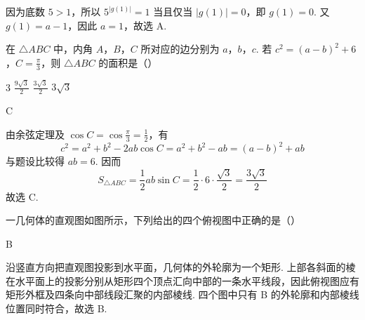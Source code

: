 \begin{solution}
因为底数 \(5>1\)，所以 \(5^{|g(1)|}=1\) 当且仅当 \(|g(1)|=0\)，即 \(g(1)=0\). 又 \(g(1)=a-1\)，因此 \(a=1\)，故选 A.
\end{solution}

\begin{problem}
在 \(\triangle ABC\) 中，内角 \(A\)，\(B\)，\(C\) 所对应的边分别为 \(a\)，\(b\)，\(c\). 若 \(c^2 = (a - b)^2 + 6\)，\(C = \frac{\pi}{3}\)，则 \(\triangle ABC\) 的面积是（\quad）

\choices
    {3}
    {\( \frac{9\sqrt{3}}{2} \)}
    {\( \frac{3\sqrt{3}}{2} \)}
    {\(3\sqrt{3}\)}
\end{problem}

\begin{answer}
C
\end{answer}

\begin{solution}
由余弦定理及 \(\cos C=\cos\frac{\pi}{3}=\frac12\)，有
\[
c^2=a^2+b^2-2ab\cos C=a^2+b^2-ab=(a-b)^2+ab
\]
与题设比较得 \(ab=6\). 因而
\[
S_{\triangle ABC}=\frac12ab\sin C=\frac12\cdot6\cdot\frac{\sqrt3}{2}=\frac{3\sqrt3}{2}
\]
故选 C.
\end{solution}

\begin{problem}
一几何体的直观图如图所示，下列给出的四个俯视图中正确的是（\quad）


    {}
    {}
    {}
\end{problem}

\begin{answer}
B
\end{answer}

\begin{solution}
沿竖直方向把直观图投影到水平面，几何体的外轮廓为一个矩形. 上部各斜面的棱在水平面上的投影分别从矩形四个顶点汇向中部的一条水平线段，因此俯视图应有矩形外框及四条向中部线段汇聚的内部棱线. 四个图中只有 B 的外轮廓和内部棱线位置同时符合，故选 B.
\end{solution}

